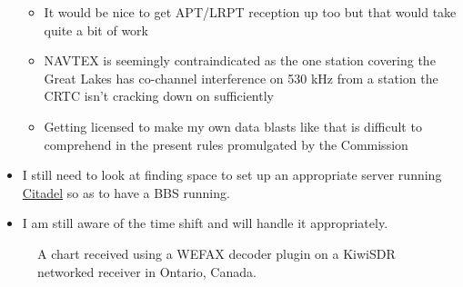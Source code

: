 \begin{itemize}
  \begin{itemize}
  \tightlist
  \item
    It would be nice to get APT/LRPT reception up too but that would
    take quite a bit of work
  \item
    NAVTEX is seemingly contraindicated as the one station covering the
    Great Lakes has co-channel interference on 530 kHz from a station
    the CRTC isn't cracking down on sufficiently
  \item
    Getting licensed to make my own data blasts like that is difficult
    to comprehend in the present rules promulgated by the Commission
  \end{itemize}
\item
  I still need to look at finding space to set up an appropriate server
  running \href{https://citadel.org/}{Citadel} so as to have a BBS
  running.
\item
  I am still aware of the time shift and will handle it appropriately.
\end{itemize}

\begin{figure}
\centering
{}
\caption{A chart received using a WEFAX decoder plugin on a KiwiSDR
networked receiver in Ontario, Canada.}
\end{figure}
